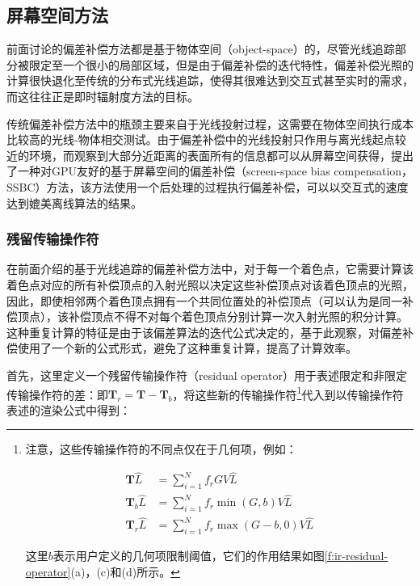 \subsection{屏幕空间方法}
前面讨论的偏差补偿方法都是基于物体空间（object-space）的，尽管光线追踪部分被限定至一个很小的局部区域，但是由于偏差补偿的迭代特性，偏差补偿光照的计算很快退化至传统的分布式光线追踪，使得其很难达到交互式甚至实时的需求，而这往往正是即时辐射度方法的目标。

传统偏差补偿方法中的瓶颈主要来自于光线投射过程，这需要在物体空间执行成本比较高的光线-物体相交测试。由于偏差补偿中的光线投射只作用与离光线起点较近的环境，而观察到大部分近距离的表面所有的信息都可以从屏幕空间获得，\cite{a:Screen-SpaceBiasCompensationfor}提出了一种对GPU友好的基于屏幕空间的偏差补偿（screen-space bias compensation，SSBC）方法，该方法使用一个后处理的过程执行偏差补偿，可以以交互式的速度达到媲美离线算法的结果。




\subsubsection{残留传输操作符}
在前面介绍的基于光线追踪的偏差补偿方法中，对于每一个着色点，它需要计算该着色点对应的所有补偿顶点的入射光照以决定这些补偿顶点对该着色顶点的光照，因此，即使相邻两个着色顶点拥有一个共同位置处的补偿顶点（可以认为是同一补偿顶点），该补偿顶点不得不对每个着色顶点分别计算一次入射光照的积分计算。这种重复计算的特征是由于该偏差算法的迭代公式决定的，基于此观察，\cite{a:Screen-SpaceBiasCompensationfor}对偏差补偿使用了一个新的公式形式，避免了这种重复计算，提高了计算效率。

首先，这里定义一个残留传输操作符（residual operator）用于表述限定和非限定传输操作符的差：即$\mathbf{T}_r = \mathbf{T}-\mathbf{T}_b$，将这些新的传输操作符\footnote{
注意，这些传输操作符的不同点仅在于几何项，例如：

\begin{equation*}
\begin{aligned}
	\mathbf{T}\hat{L}  &=\sum^{N}_{i=1}f_rGV\hat{L}\\
	\mathbf{T}_b\hat{L}&=\sum^{N}_{i=1}f_r \min(G,b)V\hat{L}\\
	\mathbf{T}_r\hat{L}&=\sum^{N}_{i=1}f_r \max(G-b,0)V\hat{L}
\end{aligned}
\end{equation*}

这里$b$表示用户定义的几何项限制阈值，它们的作用结果如图\ref{f:ir-residual-operator}(a)，(c)和(d)所示。 
}代入到以传输操作符表述的渲染公式中得到：

